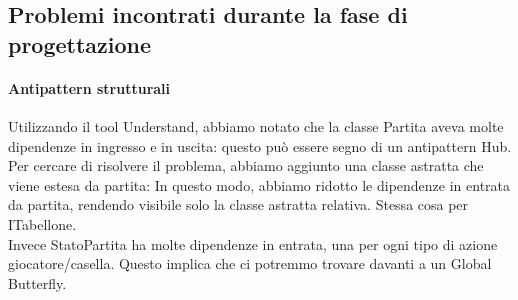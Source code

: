\documentclass{article}
\begin{document}
\subsection{Problemi incontrati durante la fase di progettazione}
\paragraph{Antipattern strutturali}
Utilizzando il tool Understand, abbiamo notato che la classe Partita aveva molte dipendenze in ingresso e in uscita: questo può essere segno di un antipattern Hub. Per cercare di risolvere il problema, abbiamo aggiunto una classe astratta che viene estesa da partita: In questo modo, abbiamo ridotto le dipendenze in entrata da partita, rendendo visibile solo la classe astratta relativa. Stessa cosa per ITabellone.
\\Invece StatoPartita ha molte dipendenze in entrata, una per ogni tipo di azione 
giocatore/casella. Questo implica che ci potremmo trovare davanti a un Global Butterfly.
\end{document}
